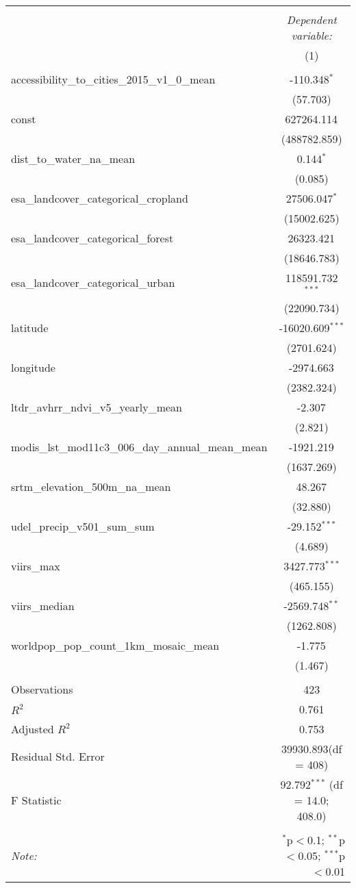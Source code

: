 \begin{table}[!htbp] \centering
\begin{tabular}{@{\extracolsep{5pt}}lc}
\\[-1.8ex]\hline
\hline \\[-1.8ex]
& \multicolumn{1}{c}{\textit{Dependent variable:}} \
\cr \cline{1-2}
\\[-1.8ex] & (1) \\
\hline \\[-1.8ex]
 accessibility_to_cities_2015_v1_0_mean & -110.348$^{*}$ \\
  & (57.703) \\
 const & 627264.114$^{}$ \\
  & (488782.859) \\
 dist_to_water_na_mean & 0.144$^{*}$ \\
  & (0.085) \\
 esa_landcover_categorical_cropland & 27506.047$^{*}$ \\
  & (15002.625) \\
 esa_landcover_categorical_forest & 26323.421$^{}$ \\
  & (18646.783) \\
 esa_landcover_categorical_urban & 118591.732$^{***}$ \\
  & (22090.734) \\
 latitude & -16020.609$^{***}$ \\
  & (2701.624) \\
 longitude & -2974.663$^{}$ \\
  & (2382.324) \\
 ltdr_avhrr_ndvi_v5_yearly_mean & -2.307$^{}$ \\
  & (2.821) \\
 modis_lst_mod11c3_006_day_annual_mean_mean & -1921.219$^{}$ \\
  & (1637.269) \\
 srtm_elevation_500m_na_mean & 48.267$^{}$ \\
  & (32.880) \\
 udel_precip_v501_sum_sum & -29.152$^{***}$ \\
  & (4.689) \\
 viirs_max & 3427.773$^{***}$ \\
  & (465.155) \\
 viirs_median & -2569.748$^{**}$ \\
  & (1262.808) \\
 worldpop_pop_count_1km_mosaic_mean & -1.775$^{}$ \\
  & (1.467) \\
\hline \\[-1.8ex]
 Observations & 423 \\
 $R^2$ & 0.761 \\
 Adjusted $R^2$ & 0.753 \\
 Residual Std. Error & 39930.893(df = 408)  \\
 F Statistic & 92.792$^{***}$ (df = 14.0; 408.0) \\
\hline
\hline \\[-1.8ex]
\textit{Note:} & \multicolumn{1}{r}{$^{*}$p$<$0.1; $^{**}$p$<$0.05; $^{***}$p$<$0.01} \\
\end{tabular}
\end{table}